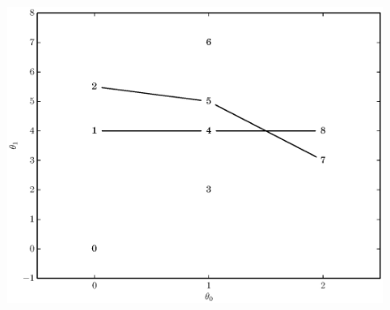 \begin{figure}[!t]
    \caption{\label{plot:simple_graph_greedy_paths}}
    \centering
    \includegraphics[width=\figwidthscale\textwidth]{plots/small_graph_ex_greedy_paths.eps}
    \CaptionWithTitle{%
    }{}
\end{figure}

